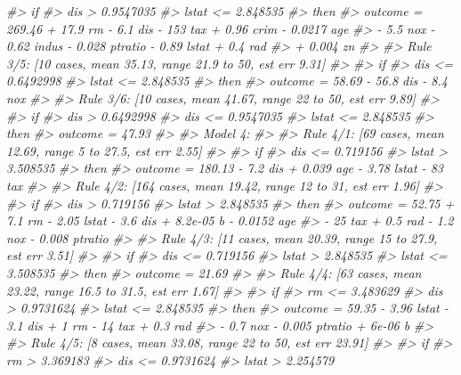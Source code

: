\documentclass[]{book}
\newenvironment{Shaded}{\begin{snugshade}}{\end{snugshade}}
\newcommand{\CommentTok}[1]{\textcolor[rgb]{0.56,0.35,0.01}{\textit{#1}}}
\begin{document}
\begin{Shaded}
\begin{Highlighting}[]
\CommentTok{#>     if}
\CommentTok{#>  dis > 0.9547035}
\CommentTok{#>  lstat <= 2.848535}
\CommentTok{#>     then}
\CommentTok{#>  outcome = 269.46 + 17.9 rm - 6.1 dis - 153 tax + 0.96 crim - 0.0217 age}
\CommentTok{#>            - 5.5 nox - 0.62 indus - 0.028 ptratio - 0.89 lstat + 0.4 rad}
\CommentTok{#>            + 0.004 zn}
\CommentTok{#> }
\CommentTok{#>   Rule 3/5: [10 cases, mean 35.13, range 21.9 to 50, est err 9.31]}
\CommentTok{#> }
\CommentTok{#>     if}
\CommentTok{#>  dis <= 0.6492998}
\CommentTok{#>  lstat <= 2.848535}
\CommentTok{#>     then}
\CommentTok{#>  outcome = 58.69 - 56.8 dis - 8.4 nox}
\CommentTok{#> }
\CommentTok{#>   Rule 3/6: [10 cases, mean 41.67, range 22 to 50, est err 9.89]}
\CommentTok{#> }
\CommentTok{#>     if}
\CommentTok{#>  dis > 0.6492998}
\CommentTok{#>  dis <= 0.9547035}
\CommentTok{#>  lstat <= 2.848535}
\CommentTok{#>     then}
\CommentTok{#>  outcome = 47.93}
\CommentTok{#> }
\CommentTok{#> Model 4:}
\CommentTok{#> }
\CommentTok{#>   Rule 4/1: [69 cases, mean 12.69, range 5 to 27.5, est err 2.55]}
\CommentTok{#> }
\CommentTok{#>     if}
\CommentTok{#>  dis <= 0.719156}
\CommentTok{#>  lstat > 3.508535}
\CommentTok{#>     then}
\CommentTok{#>  outcome = 180.13 - 7.2 dis + 0.039 age - 3.78 lstat - 83 tax}
\CommentTok{#> }
\CommentTok{#>   Rule 4/2: [164 cases, mean 19.42, range 12 to 31, est err 1.96]}
\CommentTok{#> }
\CommentTok{#>     if}
\CommentTok{#>  dis > 0.719156}
\CommentTok{#>  lstat > 2.848535}
\CommentTok{#>     then}
\CommentTok{#>  outcome = 52.75 + 7.1 rm - 2.05 lstat - 3.6 dis + 8.2e-05 b - 0.0152 age}
\CommentTok{#>            - 25 tax + 0.5 rad - 1.2 nox - 0.008 ptratio}
\CommentTok{#> }
\CommentTok{#>   Rule 4/3: [11 cases, mean 20.39, range 15 to 27.9, est err 3.51]}
\CommentTok{#> }
\CommentTok{#>     if}
\CommentTok{#>  dis <= 0.719156}
\CommentTok{#>  lstat > 2.848535}
\CommentTok{#>  lstat <= 3.508535}
\CommentTok{#>     then}
\CommentTok{#>  outcome = 21.69}
\CommentTok{#> }
\CommentTok{#>   Rule 4/4: [63 cases, mean 23.22, range 16.5 to 31.5, est err 1.67]}
\CommentTok{#> }
\CommentTok{#>     if}
\CommentTok{#>  rm <= 3.483629}
\CommentTok{#>  dis > 0.9731624}
\CommentTok{#>  lstat <= 2.848535}
\CommentTok{#>     then}
\CommentTok{#>  outcome = 59.35 - 3.96 lstat - 3.1 dis + 1 rm - 14 tax + 0.3 rad}
\CommentTok{#>            - 0.7 nox - 0.005 ptratio + 6e-06 b}
\CommentTok{#> }
\CommentTok{#>   Rule 4/5: [8 cases, mean 33.08, range 22 to 50, est err 23.91]}
\CommentTok{#> }
\CommentTok{#>     if}
\CommentTok{#>  rm > 3.369183}
\CommentTok{#>  dis <= 0.9731624}
\CommentTok{#>  lstat > 2.254579}

\end{Highlighting}
\end{Shaded}
\end{document}
